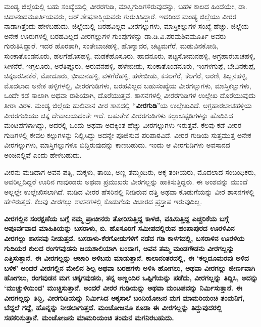 ಮಂಡ್ಯ ಜಿಲ್ಲೆಯಲ್ಲಿ ಬಹು ಸಂಖ್ಯೆಯಲ್ಲಿ ವೀರರಗುಡಿ, ಮಾಸ್ತಿಗುಡಿಗಳಿರುವುದನ್ನು, ಬಹಳ ಕಾಲದ ಹಿಂದೆಯೇ, ಡಾ. ಚಿದಾನಂದಮೂರ್ತಿಯವರು, ಆರ್​.ಶೇಷಶಾಸ್ತ್ರಿಯವರು ಗುರುತಿಸಿದ್ದಾರೆ. ಇದರಿಂದ ಮಂಡ್ಯ ಜಿಲ್ಲೆಯು ವೀರರ ನಾಡಾಗಿತ್ತೆಂದು ಹೇಳಬಹುದು. ಜಿಲ್ಲೆಯಲ್ಲಿ ಬರಹವಿಲ್ಲದ ವೀರಗಲ್ಲುಗಳು, ಮಾಸ್ತಿಕಲ್ಲುಗಳ ಸಂಖ್ಯೆ ಹೆಚ್ಚು. ಜಿಲ್ಲೆಯ ಅನೇಕ ಊರುಗಳಲ್ಲಿ ಬರಹವಿಲ್ಲದ ವೀರಗಲ್ಲುಗಳ ಗುಂಪುಗಳನ್ನು ಡಾ.ಡಿ.ವಿ.ಪರಮಶಿವಮೂರ್ತಿ ಅವರು ಗುರುತಿಸಿದ್ದಾರೆ. ಇದರ ಹೊರತಾಗಿ, ಸಂತೇಬಾಚಹಳ್ಳಿ, ಹೊನ್ನಾವರ, ಚಟ್ಟಮಗೆರೆ, ಮಡುವಿನಕೋಡಿ, ಸುಂಕಾತೊಂಡನೂರು, ಹಲಗೆಹೊಸಹಳ್ಳಿ, ಮಡಕೆಹೊಸೂರು, ಹಾದನೂರು, ಪಟ್ಟಸೋಮನಹಳ್ಳಿ, ಅಗ್ರಹಾರಬಾಚಹಳ್ಳಿ, ಸೀಳನೆರೆ, ಇಗ್ಗಲೂರು, ಅರೆತಿಪ್ಪೂರು, ಅರುವನಹಳ್ಳಿ, ಹಳೇಬೀಡು, ಸುಂಕಾತೊಂಡನೂರು, ಇಂಗಳಗುಪ್ಪೆ, ಬೇವಿನಕುಪ್ಪೆ, ಚಿಕ್ಕಅರಸಿನಕೆರೆ, ಮೋದೂರು, ಭೀಮನಹಳ್ಳಿ, ವಳಗೆರೆಹಳ್ಳಿ, ಹಳೇಬೀಡು, ಕಸಲಗೆರೆ, ಕೆಲಗೆರೆ, ಆರಣಿ, ತಿಬ್ಬನಹಳ್ಳಿ, ಮೊದಲಾದ ಅನೇಕ ಹಳ್ಳಿಗಳಲ್ಲಿ, ವೀರರಗುಡಿಗಳು, ಬರಹವಿಲ್ಲದ ಬಹುಸಂಖ್ಯೆಯ ವೀರಗಲ್ಲುಗಳು, ಮಾಸ್ತಿಕಲ್ಲುಗಳು, ಒಂದೇ ಕಡೆ ಸಾಲಾಗಿ ಅಥವಾ ರಾಶಿಯಾಗಿ, ದೊರೆಯುತ್ತವೆ. ಶಾಸನಗಳಲ್ಲಿ ವೀರರಗುಡಿಗಳ ಉಲ್ಲೇಖ ದೊರೆಯುವುದು ತೀರಾ ವಿರಳ. ಮಂಡ್ಯ ಜಿಲ್ಲೆಯ ಹುಲಿವಾನ ವೀರ ಶಾಸದಲ್ಲಿ “\textbf{ವೀರಗುಡಿ}”ಯ ಉಲ್ಲೇಖವಿದೆ. ಅಗ್ರಹಾರಬಾಚಹಳ್ಳಿಯ ವೀರರಗುಡಿಯು ಚಿಕ್ಕ ದೇವಾಲಯದಂತೇ ಇದೆ. ಬಹುತೇಕ ವೀರರಗುಡಿಗಳು ಕಲ್ಲುಚಪ್ಪಡಿಗಳನ್ನು ಹೊದಿಸಿದ ಮಂಟಪಗಳಾ\-ಗಿದ್ದು, ಅದರಲ್ಲಿ ಒಂದು ಅಥವಾ ಅದಕ್ಕಿಂತ ಹೆಚ್ಚು ವೀರಗಲ್ಲುಗಳು ಇರುತ್ತವೆ. ಕೆಲವು ಕಡೆ ವೀರರ ಗುಡಿಗಳಲ್ಲಿ ಕೇವಲ ಕಲ್ಲುಗಳನ್ನು ನಿಲ್ಲಿಸಿದ್ದು ಅದನ್ನೇ ಪೂಜಿಸುವ ಪರಿಪಾಠವಿದೆ. ವೀರರ ಗುಡಿಯ ಸುತ್ತಮುತ್ತ ಅನೇಕ ವೀರಗಲ್ಲುಗಳು, ಮಾಸ್ತಿಗಲ್ಲುಗಳೂ ಬಿದ್ದಿರುವುದನ್ನು ಕಾಣಬಹುದು. ಇಂದು ಆ ವೀರಗುಡಿಗಳು ಅವಸಾನದ ಅಂಚಿನಲ್ಲಿವೆ ಎಂದು ಹೇಳಬಹುದು.

ವೀರನು ಮಡಿದಾಗ ಅವನ ಪತ್ನಿ, ಮಕ್ಕಳು, ತಾಯಿ, ಅಣ್ಣ ತಮ್ಮಂದಿರು, ಅಕ್ಕ ತಂಗಿಯರು, ಮೊದಲಾದ ಸಂಬಂಧಿ\-ಕರು, ಅವರಿಲ್ಲದಿದ್ದರೆ ಊರಿನ ಗಾವುಂಡರು ಅಥವಾ ಪ್ರಮುಖರು ವೀರಗಲ್ಲನ್ನು ಹಾಕಿಸುತ್ತಿದ್ದರು. ಈ ಅಂಶವನ್ನು ಮುಂದೆ ಅಲ್ಲಲ್ಲೇ ಉಲ್ಲೇಖಿಸಲಾಗಿದೆ. ಮಡಿದ ವೀರರ ಹೆಸರಿನಲ್ಲಿ ನೀಡಿರುವ ದತ್ತಿ ಅಥವಾ ಕೊಡುಗೆಯನ್ನು ವೀರ ಶಾಸನಗಳಲ್ಲಿ ಹೇಳಿರುತ್ತದೆ. ಕೆಲವು ವೀರಗಲ್ಲು ಶಾಸನಗಳಲ್ಲಿ ಕೊಡುಗೆಯ ವಿಚಾರದ ಪ್ರಸ್ತಾಪ ಇರುವುದಿಲ್ಲ.

\textbf{ವೀರಗಲ್ಲಿನ ಸಂರಕ್ಷಣೆಯ ಬಗ್ಗೆ ನಮ್ಮ ಪ್ರಾಚೀನರು ತೋರಿಸುತ್ತಿದ್ದ ಕಾಳಜಿ, ವಹಿಸುತ್ತಿದ್ದ ಎಚ್ಚರಿಕೆಯ ಬಗ್ಗೆ ಅಪೂರ್ವವಾದ ಮಾಹಿತಿಯನ್ನು ಬಸರಾಳು, ಬಿ. ಹೊಸೂರಿಗೆ ಸಮೀಪದಲ್ಲಿರುವ ಹಂಪಾಪುರದ ಊರಳಿವಿನ ವೀರಗಲ್ಲು ಶಾಸನವು ನೀಡುತ್ತದೆ. ಬಸರಾಳು-ಕೆರಗೋಡುಗಳಿಗೆ ನಡೆದ ಗಡಿ ಕಾಳಗದಲ್ಲಿ, ಬಸರಾಳಿನ ಊರಳಿಯ ಗುದಿಯರ ಕುಲದ ರಂಗಗವುಡನು ಜಯಶಾಲಿಯಾಗಿ ಬಂದಾಗ, ಅವನ ತಮ್ಮ ಮಂಡಗೌಡನು ವೀರಗಲ್ಲನ್ನು ಎತ್ತಿಸುತ್ತಾನೆ. ಈ ವೀರಗಲ್ಲನ್ನು ಆಚಾರಿ ಅಳಿಬನು ಮಾಡುತ್ತಾನೆ. ಕಾಲಾನಂತರದಲ್ಲಿ, ಈ ‘ಕಲ್ಲದೂಮರವು ಅಳಿದ ಬಳಿಕ’ ಅಂದರೆ ವೀರಗಲ್ಲಿನ ಮೇಲಿನ ಶಿಲ್ಪ ಅಥವಾ ಬರಹಗಳು ಅಳಿಸಿ ಹೋಗಲು, ಅಥವಾ ವೀರಗಲ್ಲು ಜೀರ್ಣವಾಗಿ ಹೋಗಲು, ರಂಗವುಡನ ಮಗ ಚಿಕ್ಕಗವುಡನು, ತನ್ನ ಅಣ್ಣಂದಿರ ಒಪ್ಪಿಗೆಯನ್ನು ಪಡೆದು, ವೀರಗಲ್ಲನ್ನು ತಿದ್ದಿಸಿ, ಅದನ್ನು ‘ಮುಚ್ಚುಳಿಯಿಂದ’ ಮುಚ್ಚಿಸುತ್ತಾನೆ. ಅಂದರೆ ವೀರರ ಗುಡಿಯನ್ನು ಅಥವಾ ಮಂಟಪವನ್ನು ನಿರ್ಮಿಸುತ್ತಾನೆ. ಈ ವೀರಗಲ್ಲನ್ನು ತಿದ್ದಿ, ವೀರಗುಡಿಯನ್ನು ನಿರ್ಮಿಸಿದ ಅಕ್ಕಸಾಲೆ ಬಂದಿಯೋಜನ ಮಗ ಮಾಮರಿಯಂಚಿ ತಂಮನಿಗೆ,  ಬೆದ್ದಲೆ ಗದ್ದೆ,  ಹೊನ್ನನ್ನು ನೀಡಲಾಗುತ್ತದೆ. ಮಂಚೋಜನೂ ಕೂಡಾ ಈ ವೀರಗಲ್ಲನ್ನು ತಿದ್ದುವುದರಲ್ಲಿ ಸಹಕರಿಸುತ್ತಾನೆ. ಮಂಚೋಜನು ಮಾಮರಿಯಂಚಿ ತಂಮನ ಮಗನಿರಬಹುದು.}

